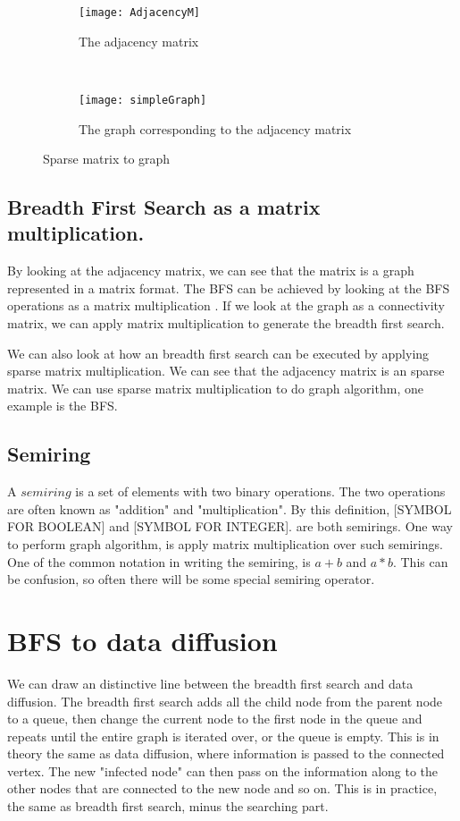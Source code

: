 {\begin{figure}
	\begin{subfigure}{0.5\textwidth}
	\texttt{[image: AdjacencyM]}
	\caption{The adjacency matrix}
	\label{fig:AdjacencyM}
	\end{subfigure}
	~
	\begin{subfigure}{0.5\textwidth}
	\texttt{[image: simpleGraph]}
	\caption{The graph corresponding to the adjacency matrix}
	\label{fig:matrix}
	\end{subfigure}
 	\caption{Sparse matrix to graph}
\end{figure}

\subsection{Breadth First Search as a matrix multiplication.}
By looking at the adjacency matrix, we can see that the matrix is a graph represented in a matrix format. The BFS can be achieved by looking at the BFS operations as a matrix multiplication \cite{algoToMath}. If we look at the graph as a connectivity matrix, we can apply matrix multiplication to generate the breadth first search. 

We can also look at how an breadth first search can be executed by applying  sparse matrix multiplication. We can see that the adjacency matrix is an sparse matrix. We can use sparse matrix multiplication to do graph algorithm, one example is the BFS. 


\subsection{Semiring}
A $semiring$ is a set of elements with two binary operations. The two operations are often known as "addition" and "multiplication". By this definition, [SYMBOL FOR BOOLEAN] and [SYMBOL FOR INTEGER]. are both semirings.  One way to perform graph algorithm, is apply matrix multiplication over such semirings. One of the common notation in writing the semiring, is $a+b$ and $a \ast b$. This can be confusion, so often there will be some special semiring operator.



\section{BFS to data diffusion}
We can draw an distinctive line between the breadth first search and data diffusion. The breadth first search adds all the child node from the parent node to a queue, then change the current node to the first node in the queue and repeats until the entire graph is iterated over, or the queue is empty. This is in theory the same as data diffusion, where information is passed to the connected vertex. The new "infected node" can then pass on the information along to the other nodes that are connected to the new node and so on. This is in practice, the same as breadth first search, minus the searching part. 

}
